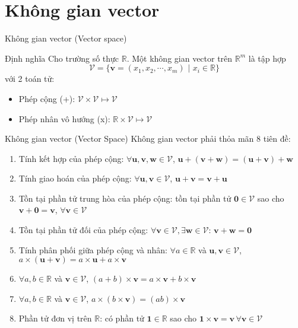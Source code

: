 \section{Không gian vector}

\begin{frame}{Không gian vector (Vector space)}
    \begin{block}{Định nghĩa}
        Cho trường số thực $\mathbb{R}$. Một không gian vector trên $\mathbb{R}^m$ là tập hợp \[\mathcal{V}=\{\bm{v}=(x_1, x_2, \cdots, x_m) \text{ | } x_i \in \mathbb{R}\}\] với 2 toán tử:
        \begin{itemize}
            \item Phép cộng (+): $\mathcal{V} \times \mathcal{V} \mapsto \mathcal{V}$
            \item Phép nhân vô hướng (x): $\mathbb{R} \times \mathcal{V} \mapsto \mathcal{V}$
        \end{itemize}
    \end{block}
    
\end{frame}

\begin{frame}{Không gian vector (Vector Space)}
    Không gian vector phải thỏa mãn 8 tiên đề:
    \begin{enumerate}
        \item Tính kết hợp của phép cộng: $\forall \bm{u}, \bm{v}, \bm{w} \in \mathcal{V}$, $\bm{u}+(\bm{v}+\bm{w})=(\bm{u}+\bm{v})+\bm{w}$
        \item Tính giao hoán của phép cộng: $\forall \bm{u}, \bm{v} \in \mathcal{V}$, $\bm{u}+\bm{v}=\bm{v}+\bm{u}$
        \item Tồn tại phần tử trung hòa của phép cộng: tồn tại phần tử $\bm{0} \in \mathcal{V}$ sao cho $\bm{v}+\bm{0}=\bm{v}$, $\forall \bm{v} \in \mathcal{V}$
        \item Tồn tại phần tử đối của phép cộng: $\forall \bm{v} \in \mathcal{V}, \exists \bm{w} \in \mathcal{V}$: $\bm{v}+\bm{w}=\bm{0}$
        \item Tính phân phối giữa phép cộng và nhân: $\forall a \in \mathbb{R}$ và $\bm{u}, \bm{v} \in \mathcal{V}$, $a \times (\bm{u} + \mathbf{v}) = a \times \bm{u} + a \times \bm{v}$
        \item $\forall a, b \in \mathbb{R}$ và $\bm{v} \in \mathcal{V}$, $(a+b) \times \bm{v}=a \times \bm{v}+b \times \bm{v}$
        \item $\forall a, b \in \mathbb{R}$ và $\bm{v} \in \mathcal{V}$, $a \times (b \times \bm{v})=(ab) \times \bm{v}$
        \item Phần tử đơn vị trên $\mathbb{R}$: có phần tử $\bm{1} \in \mathbb{R}$ sao cho $\bm{1} \times \bm{v} = \bm{v} \, \forall \bm{v} \in \mathcal{V}$
    \end{enumerate}
\end{frame}

